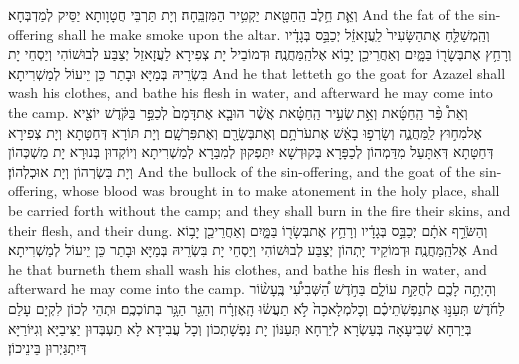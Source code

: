 {וְאֵ֛ת חֵ֥לֶב הַֽחַטָּ֖את יַקְטִ֥יר הַמִּזְבֵּֽחָה׃}
{וְיָת תַּרְבֵּי חֲטָוָותָא יַסֵּיק לְמַדְבְּחָא׃}
{And the fat of the sin-offering shall he make smoke upon the altar.}{}
{וְהַֽמְשַׁלֵּ֤חַ אֶת\maqqaf הַשָּׂעִיר֙ לַֽעֲזָאזֵ֔ל יְכַבֵּ֣ס בְּגָדָ֔יו וְרָחַ֥ץ אֶת\maqqaf בְּשָׂר֖וֹ בַּמָּ֑יִם וְאַחֲרֵי\maqqaf כֵ֖ן יָב֥וֹא אֶל\maqqaf הַֽמַּחֲנֶֽה׃}
{וּדְמוֹבֵיל יָת צְפִירָא לַעֲזָאזֵל יְצַבַּע לְבוּשׁוֹהִי וְיַסְחֵי יָת בִּשְׂרֵיהּ בְּמַיָּא וּבָתַר כֵּן יֵיעוֹל לְמַשְׁרִיתָא׃}
{And he that letteth go the goat for Azazel shall wash his clothes, and bathe his flesh in water, and afterward he may come into the camp.}{}
{וְאֵת֩ פַּ֨ר הַֽחַטָּ֜את וְאֵ֣ת \legarmeh  שְׂעִ֣יר הַֽחַטָּ֗את אֲשֶׁ֨ר הוּבָ֤א אֶת\maqqaf דָּמָם֙ לְכַפֵּ֣ר בַּקֹּ֔דֶשׁ יוֹצִ֖יא אֶל\maqqaf מִח֣וּץ לַֽמַּחֲנֶ֑ה וְשָׂרְפ֣וּ בָאֵ֔שׁ אֶת\maqqaf עֹרֹתָ֥ם וְאֶת\maqqaf בְּשָׂרָ֖ם וְאֶת\maqqaf פִּרְשָֽׁם׃}
{וְיָת תּוֹרָא דְּחַטָּתָא וְיָת צְפִירָא דְּחַטָּתָא דְּאִתָּעַל מִדַּמְהוֹן לְכַפָּרָא בְּקוּדְשָׁא יִתַּפְקוּן לְמִבַּרָא לְמַשְׁרִיתָא וְיוֹקְדוּן בְּנוּרָא יָת מַשְׁכְּהוֹן וְיָת בִּשְׂרְהוֹן וְיָת אוּכְלְהוֹן׃}
{And the bullock of the sin-offering, and the goat of the sin-offering, whose blood was brought in to make atonement in the holy place, shall be carried forth without the camp; and they shall burn in the fire their skins, and their flesh, and their dung.}{}
{וְהַשֹּׂרֵ֣ף אֹתָ֔ם יְכַבֵּ֣ס בְּגָדָ֔יו וְרָחַ֥ץ אֶת\maqqaf בְּשָׂר֖וֹ בַּמָּ֑יִם וְאַחֲרֵי\maqqaf כֵ֖ן יָב֥וֹא אֶל\maqqaf הַֽמַּחֲנֶֽה׃}
{וּדְמוֹקֵיד יָתְהוֹן יְצַבַּע לְבוּשׁוֹהִי וְיַסְחֵי יָת בִּשְׂרֵיהּ בְּמַיָּא וּבָתַר כֵּן יֵיעוֹל לְמַשְׁרִיתָא׃}
{And he that burneth them shall wash his clothes, and bathe his flesh in water, and afterward he may come into the camp.}{}
{וְהָיְתָ֥ה לָכֶ֖ם לְחֻקַּ֣ת עוֹלָ֑ם בַּחֹ֣דֶשׁ הַ֠שְּׁבִיעִ֠י בֶּֽעָשׂ֨וֹר לַחֹ֜דֶשׁ תְּעַנּ֣וּ אֶת\maqqaf נַפְשֹֽׁתֵיכֶ֗ם וְכׇל\maqqaf מְלָאכָה֙ לֹ֣א תַעֲשׂ֔וּ הָֽאֶזְרָ֔ח וְהַגֵּ֖ר הַגָּ֥ר בְּתוֹכְכֶֽם׃}
{וּתְהֵי לְכוֹן לִקְיָם עָלַם בְּיַרְחָא שְׁבִיעָאָה בְּעַשְׂרָא לְיַרְחָא תְּעַנּוֹן יָת נַפְשָׁתְכוֹן וְכָל עֲבִידָא לָא תַעְבְּדוּן יַצִּיבַיָּא וְגִיּוֹרַיָּא דְּיִתְגַּיְרוּן בֵּינֵיכוֹן׃}
